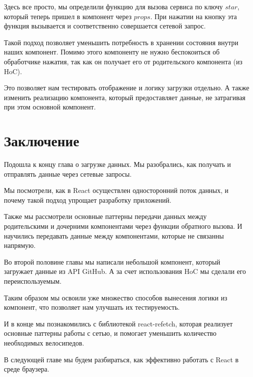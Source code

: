 Здесь все просто, мы определили функцию для вызова сервиса по ключу $star$, который теперь пришел в компонент через $props$. При нажатии на кнопку эта функция вызывается и соответственно совершается сетевой запрос.

Такой подход позволяет уменьшить потребность в хранении состояния внутри наших компонент. Помимо этого компоненту не нужно беспокоиться об обработчике нажатия, так как он получает его от родительского компонента (из HoC).

Это позволяет нам тестировать отображение и логику загрузки отдельно. А также изменить реализацию компонента, который предоставляет данные, не затрагивая при этом основной компонент.

\section{Заключение}

Подошла к концу глава о загрузке данных. Мы разобрались, как получать и отправлять данные через сетевые запросы.

Мы посмотрели, как в React осуществлен односторонний поток данных, и почему такой подход упрощает разработку приложений.

Также мы рассмотрели основные паттерны передачи данных между родительскими и дочерними компонентами через функции обратного вызова. И научились передавать данные между компонентами, которые не связанны напрямую.

Во второй половине главы мы написали небольшой компонент, который загружает данные из API GitHub. А за счет использования HoC мы сделали его переиспользуемым.

Таким образом мы освоили уже множество способов вынесения логики из компонент, что позволяет нам улучшать их тестируемость.

И в конце мы познакомились с библиотекой react-refetch, которая реализует основные паттерны работы с сетью, и помогает уменьшить количество необходимых велосипедов.

В следующей главе мы будем разбираться, как эффективно работать с React в среде браузера.








